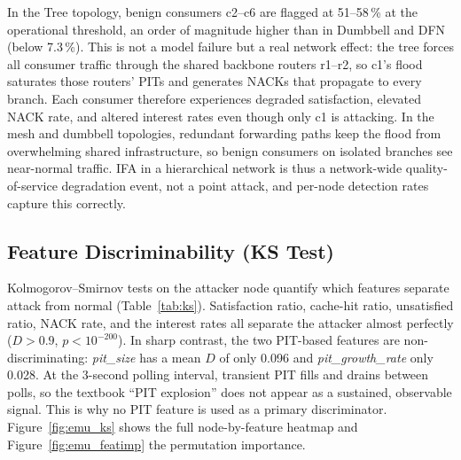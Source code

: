 \documentclass[12pt]{report}
\begin{document}
In the Tree topology, benign consumers c2--c6 are flagged at 51--58\,\% at the operational threshold, an order of magnitude higher than in Dumbbell and DFN (below 7.3\,\%). This is not a model failure but a real network effect: the tree forces all consumer traffic through the shared backbone routers r1--r2, so c1's flood saturates those routers' PITs and generates NACKs that propagate to every branch. Each consumer therefore experiences degraded satisfaction, elevated NACK rate, and altered interest rates even though only c1 is attacking. In the mesh and dumbbell topologies, redundant forwarding paths keep the flood from overwhelming shared infrastructure, so benign consumers on isolated branches see near-normal traffic. IFA in a hierarchical network is thus a network-wide quality-of-service degradation event, not a point attack, and per-node detection rates capture this correctly.

\subsection{Feature Discriminability (KS Test)}
\label{sec:ks}

Kolmogorov--Smirnov tests on the attacker node quantify which features separate attack from normal (Table~\ref{tab:ks}). Satisfaction ratio, cache-hit ratio, unsatisfied ratio, NACK rate, and the interest rates all separate the attacker almost perfectly ($D > 0.9$, $p < 10^{-200}$). In sharp contrast, the two PIT-based features are non-discriminating: \textit{pit\_size} has a mean $D$ of only 0.096 and \textit{pit\_growth\_rate} only 0.028. At the 3-second polling interval, transient PIT fills and drains between polls, so the textbook ``PIT explosion'' does not appear as a sustained, observable signal. This is why no PIT feature is used as a primary discriminator. Figure~\ref{fig:emu_ks} shows the full node-by-feature heatmap and Figure~\ref{fig:emu_featimp} the permutation importance.
\end{document}

